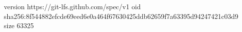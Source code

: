 version https://git-lfs.github.com/spec/v1
oid sha256:8f544882efcde69eed6e0a464f67630425ddb62659f7a63395d94247421c03d9
size 63325
